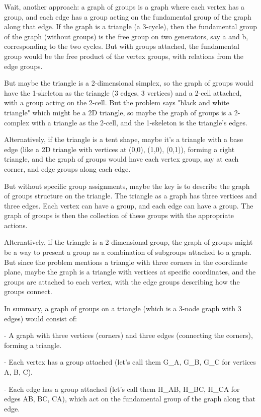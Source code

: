 Wait, another approach: a graph of groups is a graph where each vertex has a group, and each edge has a group acting on the fundamental group of the graph along that edge. If the graph is a triangle (a 3-cycle), then the fundamental group of the graph (without groups) is the free group on two generators, say a and b, corresponding to the two cycles. But with groups attached, the fundamental group would be the free product of the vertex groups, with relations from the edge groups.

But maybe the triangle is a 2-dimensional simplex, so the graph of groups would have the 1-skeleton as the triangle (3 edges, 3 vertices) and a 2-cell attached, with a group acting on the 2-cell. But the problem says "black and white triangle" which might be a 2D triangle, so maybe the graph of groups is a 2-complex with a triangle as the 2-cell, and the 1-skeleton is the triangle's edges.

Alternatively, if the triangle is a tent shape, maybe it's a triangle with a base edge (like a 2D triangle with vertices at (0,0), (1,0), (0,1)), forming a right triangle, and the graph of groups would have each vertex group, say at each corner, and edge groups along each edge.

But without specific group assignments, maybe the key is to describe the graph of groups structure on the triangle. The triangle as a graph has three vertices and three edges. Each vertex can have a group, and each edge can have a group. The graph of groups is then the collection of these groups with the appropriate actions.

Alternatively, if the triangle is a 2-dimensional group, the graph of groups might be a way to present a group as a combination of subgroups attached to a graph. But since the problem mentions a triangle with three corners in the coordinate plane, maybe the graph is a triangle with vertices at specific coordinates, and the groups are attached to each vertex, with the edge groups describing how the groups connect.

In summary, a graph of groups on a triangle (which is a 3-node graph with 3 edges) would consist of:

- A graph with three vertices (corners) and three edges (connecting the corners), forming a triangle.

- Each vertex has a group attached (let's call them G_A, G_B, G_C for vertices A, B, C).

- Each edge has a group attached (let's call them H_AB, H_BC, H_CA for edges AB, BC, CA), which act on the fundamental group of the graph along that edge.

